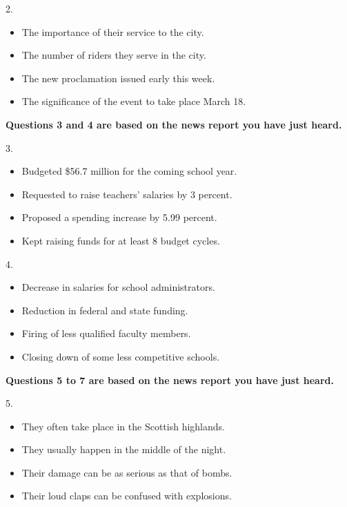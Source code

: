 \documentclass[UTF8,11pt]{ctexart}
\begin{document}
2.


\begin{itemize}[leftmargin=2em,itemsep=.2em,topsep=.4em]\item[A.] The importance of their service to the city.
\item[B.] The number of riders they serve in the city.
\item[C.] The new proclamation issued early this week.
\item[D.] The significance of the event to take place March 18.
\end{itemize}

\textbf{Questions 3 and 4 are based on the news report you have just heard.}


3.


\begin{itemize}[leftmargin=2em,itemsep=.2em,topsep=.4em]\item[A.] Budgeted \$56.7 million for the coming school year.
\item[B.] Requested to raise teachers’ salaries by 3 percent.
\item[C.] Proposed a spending increase by 5.99 percent.
\item[D.] Kept raising funds for at least 8 budget cycles.
\end{itemize}

4.


\begin{itemize}[leftmargin=2em,itemsep=.2em,topsep=.4em]\item[A.] Decrease in salaries for school administrators.
\item[B.] Reduction in federal and state funding.
\item[C.] Firing of less qualified faculty members.
\item[D.] Closing down of some less competitive schools.
\end{itemize}

\textbf{Questions 5 to 7 are based on the news report you have just heard.}


5.


\begin{itemize}[leftmargin=2em,itemsep=.2em,topsep=.4em]\item[A.] They often take place in the Scottish highlands.
\item[B.] They usually happen in the middle of the night.
\item[C.] Their damage can be as serious as that of bombs.
\item[D.] Their loud claps can be confused with explosions.
\end{itemize}
\end{document}
